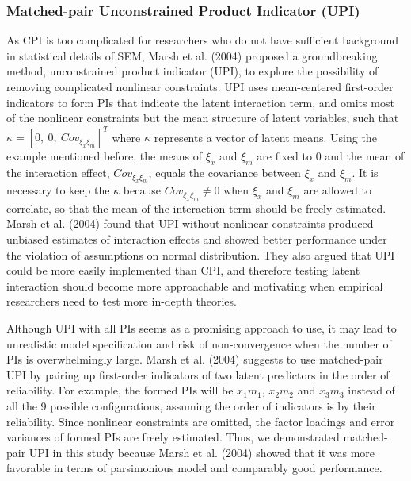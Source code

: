 \documentclass[
  man]{apa7}
\begin{document}
\hypertarget{matched-pair-unconstrained-product-indicator-upi}{%
\subsubsection{Matched-pair Unconstrained Product Indicator (UPI)}\label{matched-pair-unconstrained-product-indicator-upi}}

As CPI is too complicated for researchers who do not have sufficient background in statistical details of SEM, Marsh et al. (2004) proposed a groundbreaking method, unconstrained product indicator (UPI), to explore the possibility of removing complicated nonlinear constraints. UPI uses mean-centered first-order indicators to form PIs that indicate the latent interaction term, and omits most of the nonlinear constraints but the mean structure of latent variables, such that \(\kappa = [0, \ 0, \ Cov_{\xi_{x}\xi_{m}}]^T\) where \(\kappa\) represents a vector of latent means. Using the example mentioned before, the means of \(\xi_{x}\) and \(\xi_{m}\) are fixed to 0 and the mean of the interaction effect, \(Cov_{\xi_{x}\xi_{m}}\), equals the covariance between \(\xi_{x}\) and \(\xi_{m}\). It is necessary to keep the \(\kappa\) because \(Cov_{\xi_{x}\xi_{m}} \neq 0\) when \(\xi_{x}\) and \(\xi_{m}\) are allowed to correlate, so that the mean of the interaction term should be freely estimated. Marsh et al. (2004) found that UPI without nonlinear constraints produced unbiased estimates of interaction effects and showed better performance under the violation of assumptions on normal distribution. They also argued that UPI could be more easily implemented than CPI, and therefore testing latent interaction should become more approachable and motivating when empirical researchers need to test more in-depth theories.

Although UPI with all PIs seems as a promising approach to use, it may lead to unrealistic model specification and risk of non-convergence when the number of PIs is overwhelmingly large. Marsh et al. (2004) suggests to use matched-pair UPI by pairing up first-order indicators of two latent predictors in the order of reliability. For example, the formed PIs will be \(x_{1}m_{1}\), \(x_{2}m_{2}\) and \(x_{3}m_{3}\) instead of all the 9 possible configurations, assuming the order of indicators is by their reliability. Since nonlinear constraints are omitted, the factor loadings and error variances of formed PIs are freely estimated. Thus, we demonstrated matched-pair UPI in this study because Marsh et al. (2004) showed that it was more favorable in terms of parsimonious model and comparably good performance.
\end{document}
